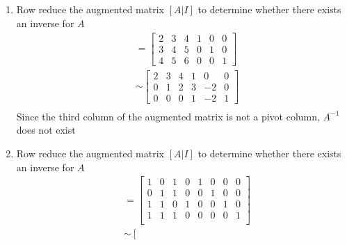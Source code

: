 \documentclass[12pt]{article}
\begin{document}
        \subsection{}
            \begin{enumerate}[label=(\alph*)]
                \item Row reduce the augmented matrix $[A | I]$ to determine whether there exists an inverse for $A$
                    \begin{align*}
                        [A | I] &= 
                        \left[\begin{array}{ccc|ccc}
                            2 & 3 & 4 & 1 & 0 & 0\\
                            3 & 4 & 5 & 0 & 1 & 0\\
                            4 & 5 & 6 & 0 & 0 & 1
                        \end{array}\right] \\
                        &\sim
                        \left[\begin{array}{ccc|ccc}
                            2 & 3 & 4 & 1 & 0 & 0\\
                            0 & 1 & 2 & 3 & -2 & 0\\
                            0 & 0 & 0 & 1 & -2 & 1
                        \end{array}\right] \\
                    \end{align*}
                    Since the third column of the augmented matrix is not a pivot column, $A^{-1}$ does not exist
                \item Row reduce the augmented matrix $[A | I]$ to determine whether there exists an inverse for $A$
                    \begin{align*}
                        [A | I] &= 
                        \left[\begin{array}{cccc|cccc}
                            1 & 0 & 1 & 0 & 1 & 0 & 0 & 0\\
                            0 & 1 & 1 & 0 & 0 & 1 & 0 & 0\\
                            1 & 1 & 0 & 1 & 0 & 0 & 1 & 0\\
                            1 & 1 & 1 & 0 & 0 & 0 & 0 & 1\\
                        \end{array}\right] \\
                        &\sim
                        \left[\begin{array}{cccc|cccc}

\end{array}
\end{align*}
\end{enumerate}
\end{document}
